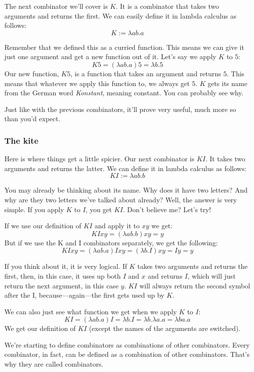 \documentclass[11pt]{article}
\begin{document}
The next combinator we'll cover is \(K\). It is a combinator that takes two
arguments and returns the first. We can easily define it in lambda calculus as
follows:
\[K:=\lambda ab.a\]

Remember that we defined this as a curried function. This means we can give it
just one argument and get a new function out of it. Let's say we apply \(K\) to
\(5\):
\[K5=(\lambda ab.a)5=\lambda b.5\]
Our new function, \(K5\), is a function that takes an argument and returns
\(5\). This means that whatever we apply this function to, we always get \(5\).
\(K\) gets its name from the German word \emph{Konstant}, meaning constant. You
can probably see why.

Just like with the previous combinators, it'll prove very useful, much more so
than you'd expect.

\subsubsection{The kite}

Here is where things get a little spicier. Our next combinator is \(KI\). It
takes two arguments and returns the latter. We can define it in lambda calculus
as follows:
\[KI:=\lambda ab.b\]

You may already be thinking about its name. Why does it have two letters? And
why are they two letters we've talked about already? Well, the answer is very
simple. If you apply \(K\) to \(I\), you get \(KI\). Don't believe me? Let's
try!

If we use our definition of \(KI\) and apply it to \(xy\) we get:
\[KIxy=(\lambda ab.b)xy=y\]
But if we use the K and I combinators separately, we get the following:
\[KIxy=(\lambda ab.a)Ixy=(\lambda b.I)xy=Iy=y\]

If you think about it, it is very logical. If \(K\) takes two arguments and
returns the first, then, in this case, it uses up both \(I\) and \(x\) and
returns \(I\), which will just return the next argument, in this case \(y\).
\(KI\) will always return the second symbol after the I, because---again---the
first gets used up by \(K\).

We can also just see what function we get when we apply \(K\) to \(I\):
\[KI=(\lambda ab.a)I=\lambda b.I=\lambda b.\lambda a.a=\lambda ba.a\] We get
our definition of \(KI\) (except the names of the arguments are switched).

We're starting to define combinators as combinations of other combinators.
Every combinator, in fact, can be defined as a combination of other
combinators. That's why they are called combinators.
\end{document}
